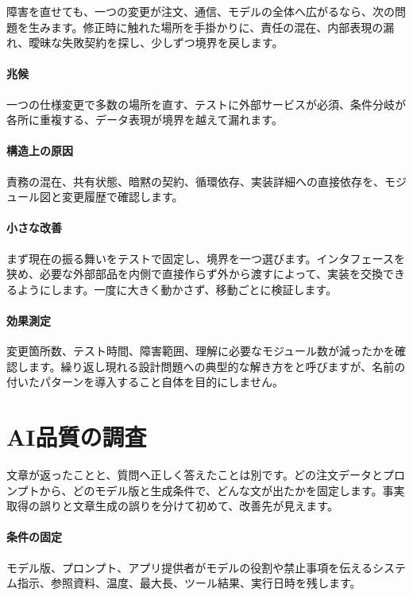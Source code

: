 障害を直せても、一つの変更が注文、通信、モデルの全体へ広がるなら、次の問題を生みます。修正時に触れた場所を手掛かりに、責任の混在、内部表現の漏れ、曖昧な失敗契約を探し、少しずつ境界を戻します。

\begingroup
\begingroup
\paragraph{兆候}
        一つの仕様変更で多数の場所を直す、テストに外部サービスが必須、条件分岐が各所に重複する、データ表現が境界を越えて漏れます。

\paragraph{構造上の原因}
        責務の混在、共有状態、暗黙の契約、循環依存、実装詳細への直接依存を、モジュール図と変更履歴で確認します。

\par
\endgroup
\medskip
\begingroup
\paragraph{小さな改善}
        まず現在の振る舞いをテストで固定し、境界を一つ選びます。インタフェースを狭め、必要な外部部品を内側で直接作らず外から渡すによって、実装を交換できるようにします。一度に大きく動かさず、移動ごとに検証します。

\paragraph{効果測定}
        変更箇所数、テスト時間、障害範囲、理解に必要なモジュール数が減ったかを確認します。繰り返し現れる設計問題への典型的な解き方をと呼びますが、名前の付いたパターンを導入すること自体を目的にしません。

\par
\endgroup
\par
\endgroup


\section{AI品質の調査}
\label{sec:07-practice-12}

文章が返ったことと、質問へ正しく答えたことは別です。どの注文データとプロンプトから、どのモデル版と生成条件で、どんな文が出たかを固定します。事実取得の誤りと文章生成の誤りを分けて初めて、改善先が見えます。

\begingroup
\begingroup
\paragraph{条件の固定}
        モデル版、プロンプト、アプリ提供者がモデルの役割や禁止事項を伝えるシステム指示、参照資料、温度、最大長、ツール結果、実行日時を残します。

